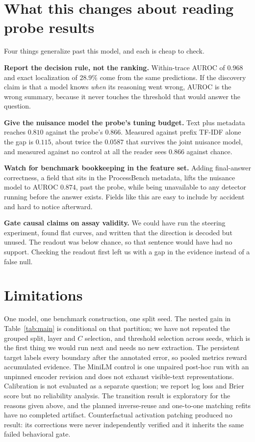 \documentclass{article}
\newcommand{\dataset}{ProcessBench}
\begin{document}
\section{What this changes about reading probe results}
\label{sec:discussion}

Four things generalize past this model, and each is cheap to check.

\textbf{Report the decision rule, not the ranking.} Within-trace AUROC of $0.968$ and exact
localization of $28.9\%$ come from the same predictions. If the discovery claim is that a model
knows \emph{when} its reasoning went wrong, AUROC is the wrong summary, because it never touches the
threshold that would answer the question.

\textbf{Give the nuisance model the probe's tuning budget.} Text plus metadata reaches $0.810$
against the probe's $0.866$. Measured against prefix TF-IDF alone the gap is $0.115$, about twice
the $0.0587$ that survives the joint nuisance model, and measured against no control at all the
reader sees $0.866$ against chance.

\textbf{Watch for benchmark bookkeeping in the feature set.} Adding final-answer correctness, a
field that sits in the \dataset{} metadata, lifts the nuisance model to AUROC $0.874$, past the
probe, while being unavailable to any detector running before the answer exists. Fields like this
are easy to include by accident and hard to notice afterward.

\textbf{Gate causal claims on assay validity.} We could have run the steering experiment, found
flat curves, and written that the direction is decoded but unused. The readout was below chance, so
that sentence would have had no support. Checking the readout first left us with a gap in the
evidence instead of a false null.

\section{Limitations}

One model, one benchmark construction, one split seed. The nested gain in Table~\ref{tab:main} is
conditional on that partition; we have not repeated the grouped split, layer and $C$ selection, and
threshold selection across seeds, which is the first thing we would run next and needs no new
extraction. The persistent target labels every boundary after the annotated error, so pooled
metrics reward accumulated evidence. The MiniLM control is one unpaired post-hoc run with an
unpinned encoder revision and does not exhaust visible-text representations. Calibration is not
evaluated as a separate question; we report log loss and Brier score but no reliability analysis.
The transition result is exploratory for the reasons given above, and the planned inverse-reuse and
one-to-one matching refits have no completed artifact. Counterfactual activation patching produced
no result: its corrections were never independently verified and it inherits the same failed
behavioral gate.
\end{document}
